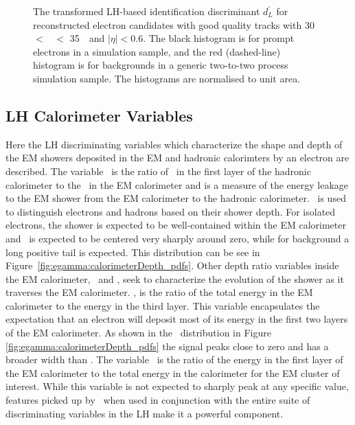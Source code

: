 \begin{figure}[t]
\begin{subfigure}[b]{0.49\textwidth}
      \caption{}
      \label{fig:egamma:ROC}
    \end{subfigure}
     \caption[]{
       The transformed LH-based identification discriminant $d^\prime_L$ for reconstructed electron candidates with good quality tracks with
       30~\GeV\ $<$ \Et\ $<$ 35~\GeV\ and \hbox{$|\eta|<0.6$}.
       The black histogram is for prompt electrons in a \Zee simulation sample, and the red (dashed-line) histogram is for backgrounds in a generic two-to-two process simulation sample.
       The histograms are normalised to unit area.
  }
\label{fig:egamma:discriminantROC}
\end{figure}

\subsection{LH Calorimeter Variables}
\label{sec:egamma:calvars}
Here the LH discriminating variables which characterize the shape and depth of the EM showers deposited in the EM and hadronic calorimters by an electron are described. 
The variable \rhadone\ is the ratio of \et\ in the first layer of the hadronic calorimeter to the \et ~in the EM calorimeter and is a measure of the energy leakage to the EM shower from the EM calorimeter to the hadronic calorimeter.
\rhadone\ is used to distinguish electrons and hadrons based on their shower depth.
For isolated electrons, the shower is expected to be well-contained within the EM calorimeter and \rhadone\ is expected to be centered very sharply around zero, while for background a long positive tail is expected.
This distribution can be see in Figure~\ref{fig:egamma:calorimeterDepth_pdfs}.
Other depth ratio variables inside the EM calorimeter, \fI\ and \fIII, seek to characterize the evolution of the shower as it traverses the EM calorimeter.
\fIII, is the ratio of the total energy in the EM calorimeter to the energy in the third layer. 
This variable encapsulates the expectation that an electron will deposit most of its energy in the first two layers of the EM calorimeter.
As shown in the \fIII\ distribution in Figure \ref{fig:egamma:calorimeterDepth_pdfs} the signal peaks close to zero and has a broader width than \rhadone.
The variable \fI\ is the ratio of the energy in the first layer of the EM calorimeter to the total energy in the calorimeter for the EM cluster of interest.
While this variable is not expected to sharply peak at any specific value, features picked up by \fI\ when used in conjunction with the entire suite of discriminating variables in the LH make it a powerful component.  

